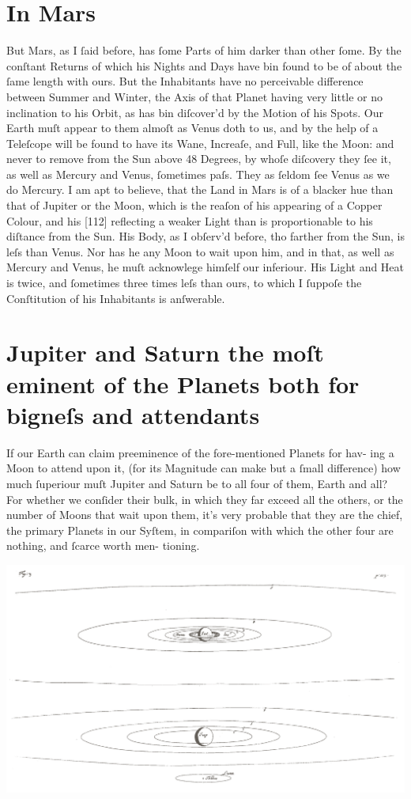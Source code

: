 \documentclass[letterpaper]{book}
\begin{document}
\section{In Mars}

But Mars, as I ſaid before, has ſome Parts of him darker than other ſome.
By the conſtant Returns of which his Nights and Days have bin found to be of
about the ſame length with ours. But the Inhabitants have no perceivable
difference between Summer and Winter, the Axis of that Planet having very
little or no inclination to his Orbit, as has bin diſcover'd by the Motion
of his Spots. Our Earth muſt appear to them almoſt as Venus doth to us, and
by the help of a Teleſcope will be found to have its Wane, Increaſe, and
Full, like the Moon: and never to remove from the Sun above 48 Degrees, by
whoſe diſcovery they ſee it, as well as Mercury and Venus, ſometimes paſs.
They as ſeldom ſee Venus as we do Mercury. I am apt to believe, that the
Land in Mars is of a blacker hue than that of Jupiter or the Moon, which is
the reaſon of his appearing of a Copper Colour, and his [112] reflecting a
weaker Light than is proportionable to his diſtance from the Sun. His Body,
as I obſerv'd before, tho farther from the Sun, is leſs than Venus. Nor has
he any Moon to wait upon him, and in that, as well as Mercury and Venus, he
muſt acknowlege himſelf our inferiour. His Light and Heat is twice, and
ſometimes three times leſs than ours, to which I ſuppoſe the Conſtitution of
his Inhabitants is anſwerable.



\section{Jupiter and Saturn the moſt eminent of the Planets both for bigneſs
and attendants}

If our Earth can claim preeminence of the fore-mentioned Planets for hav-
ing a Moon to attend upon it, (for its Magnitude can make but a ſmall
difference) how much ſuperiour muſt Jupiter and Saturn be to all four of
them, Earth and all? For whether we conſider their bulk, in which they far
exceed all the others, or the number of Moons that wait upon them, it's very
probable that they are the chief, the primary Planets in our Syſtem, in
compariſon with which the other four are nothing, and ſcarce worth men-
tioning. 

\begin{center}
	\includegraphics[width=.90\textwidth]{ct_3_en.jpg}
\end{center}
\end{document}
